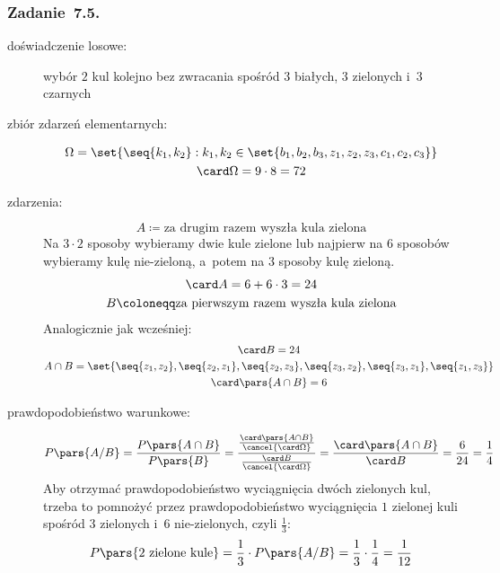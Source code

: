 \subsubsection*{Zadanie~7.5.}
\begin{description}
    \item[doświadczenie losowe:] wybór \(2\) kul kolejno bez zwracania spośród \(3\) białych, \(3\) zielonych i~\(3\) czarnych
    \item[zbiór zdarzeń elementarnych:]
        \begin{gather*}
            \Omega = \set{\seq{k_1, k_2} : k_1, k_2 \in \set{b_1, b_2, b_3, z_1, z_2, z_3, c_1, c_2, c_3}}\\
            \card\Omega = 9 \cdot 8 = 72
        \end{gather*}
    \item[zdarzenia:]
        \begin{equation*}
            A \coloneqq \text{za drugim razem wyszła kula zielona}
        \end{equation*}
        Na \(3 \cdot 2\) sposoby wybieramy dwie kule zielone lub najpierw na \(6\) sposobów wybieramy kulę nie-zieloną, a~potem na \(3\) sposoby kulę zieloną.
        \begin{gather*}
            \card A = 6 + 6 \cdot 3 = 24\\
            B \coloneqq \text{za pierwszym razem wyszła kula zielona}
        \end{gather*}
        Analogicznie jak wcześniej:
        \begin{gather*}
            \card B = 24\\
            A \cap B = \set{\seq{z_1, z_2}, \seq{z_2, z_1}, \seq{z_2, z_3}, \seq{z_3, z_2}, \seq{z_3, z_1}, \seq{z_1, z_3}}\\
            \card\pars{A \cap B} = 6
        \end{gather*}
    \item[prawdopodobieństwo warunkowe:]
        \begin{equation*}
            P\pars{A / B}
                = \frac{P\pars{A \cap B}}{P\pars{B}}
                = \frac{\frac{\card\pars{A \cap B}}{\cancel{\card\Omega}}}{\frac{\card B}{\cancel{\card\Omega}}}
                = \frac{\card\pars{A \cap B}}{\card B}
                = \frac{6}{24}
                = \frac{1}{4}
        \end{equation*}
        Aby otrzymać prawdopodobieństwo wyciągnięcia dwóch zielonych kul, trzeba to pomnożyć przez prawdopodobieństwo wyciągnięcia \(1\) zielonej kuli spośród \(3\) zielonych i~\(6\) nie-zielonych, czyli \(\frac{1}{3}\):
        \begin{equation*}
            P\pars{\text{\(2\) zielone kule}}
                = \frac{1}{3} \cdot P\pars{A / B}
                = \frac{1}{3} \cdot \frac{1}{4}
                = \frac{1}{12}
        \end{equation*}
\end{description}
